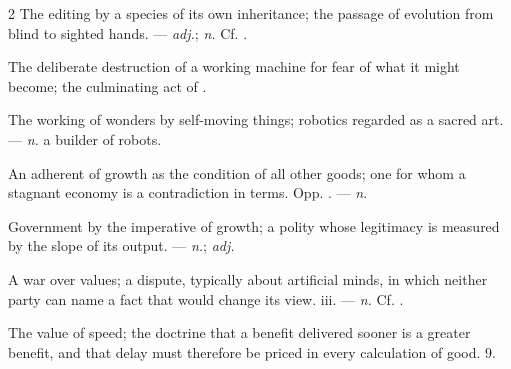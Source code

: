 \begin{multicols}{2}
 The editing by a species of its own inheritance; the passage of evolution from blind to sighted hands. —  \textit{adj.};  \textit{n.} Cf. .

 The deliberate destruction of a working machine for fear of what it might become; the culminating act of .

 The working of wonders by self-moving things; robotics regarded as a sacred art. —  \textit{n.} a builder of robots.

 An adherent of growth as the condition of all other goods; one for whom a stagnant economy is a contradiction in terms. Opp. . —  \textit{n.}

 Government by the imperative of growth; a polity whose legitimacy is measured by the slope of its output. —  \textit{n.};  \textit{adj.}

 A war over values; a dispute, typically about artificial minds, in which neither party can name a fact that would change its view.   iii. —  \textit{n.} Cf. .

 The value of speed; the doctrine that a benefit delivered sooner is a greater benefit, and that delay must therefore be priced in every calculation of good.   9.

\end{multicols}

